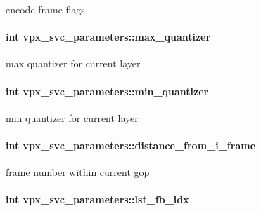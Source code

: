 encode frame flags \hypertarget{structvpx__svc__parameters_ac890a24e3ea26902f8d19552f8b7f3c7}{
\paragraph[{max\-\_\-quantizer}]{\setlength{\rightskip}{0pt plus 5cm}int {\bf vpx\-\_\-svc\-\_\-parameters\-::max\-\_\-quantizer}}}\label{structvpx__svc__parameters_ac890a24e3ea26902f8d19552f8b7f3c7}
max quantizer for current layer \hypertarget{structvpx__svc__parameters_a4073b4749d687f969d6b23826d9ccefd}{
\paragraph[{min\-\_\-quantizer}]{\setlength{\rightskip}{0pt plus 5cm}int {\bf vpx\-\_\-svc\-\_\-parameters\-::min\-\_\-quantizer}}}\label{structvpx__svc__parameters_a4073b4749d687f969d6b23826d9ccefd}
min quantizer for current layer \hypertarget{structvpx__svc__parameters_a0b04ebc9edfc8df09a1b9f65ba2d2ef6}{
\paragraph[{distance\-\_\-from\-\_\-i\-\_\-frame}]{\setlength{\rightskip}{0pt plus 5cm}int {\bf vpx\-\_\-svc\-\_\-parameters\-::distance\-\_\-from\-\_\-i\-\_\-frame}}}\label{structvpx__svc__parameters_a0b04ebc9edfc8df09a1b9f65ba2d2ef6}
frame number within current gop \hypertarget{structvpx__svc__parameters_a75d36a52bb1d3a001c668cd577ea7f8b}{
\paragraph[{lst\-\_\-fb\-\_\-idx}]{\setlength{\rightskip}{0pt plus 5cm}int {\bf vpx\-\_\-svc\-\_\-parameters\-::lst\-\_\-fb\-\_\-idx}}}\label{structvpx__svc__parameters_a75d36a52bb1d3a001c668cd577ea7f8b}
